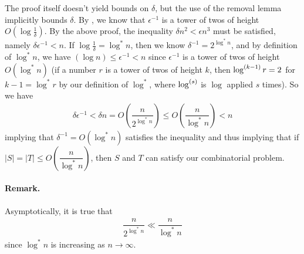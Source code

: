The proof itself doesn't yield bounds on $\delta$, but the use of the removal lemma implicitly bounds $\delta$. By \cite{Fox11}, we know that $\epsilon^{-1}$ is a tower of twos of height $O\left(\log \frac{1}{\delta}\right)$. By the above proof, the inequality $\delta n^2 < \epsilon n^3$ must be satisfied, namely $\delta \epsilon^{-1} < n$. If $\log \frac{1}{\delta} = \log^* n$, then we know $\delta^{-1} = 2^{\log^* n}$, and by definition of $\log^* n$, we have $(\log n) \leq \epsilon^{-1} < n$ since $\epsilon^{-1}$ is a tower of twos of height $O(\log^* n)$ (if a number $r$ is a tower of twos of height $k$, then $\log^{{\left(k-1\right)}} r = 2$ for $k-1 = \log^* r$ by our definition of $\log^*$, where $\log^{{\left(s\right)}}$ is $\log$ applied $s$ times). So we have
\begin{align*}
	\delta \epsilon^{-1} < \delta n = O\left(\dfrac{n}{2^{\log^* n}}\right) \leq O\left(\dfrac{n}{\log^* n}\right) < n
\end{align*}
implying that $\delta^{-1} = O(\log^* n)$ satisfies the inequality and thus implying that if $|S|=|T| \leq O\left(\dfrac{n}{\log^* n}\right)$, then $S$ and $T$ can satisfy our combinatorial problem.

\paragraph{Remark.} Asymptotically, it is true that
\begin{align*}
	\dfrac{n}{2^{\log^*n}} \ll \dfrac{n}{\log^* n}
\end{align*}
since $\log^* n$ is increasing as $n \rightarrow \infty$.